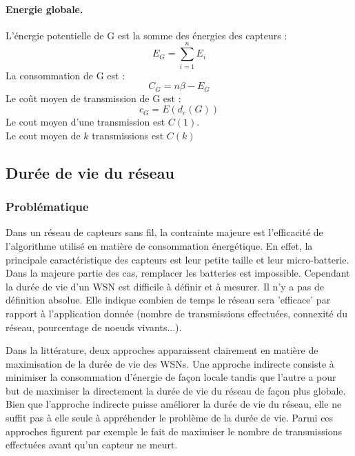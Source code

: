 \paragraph{Energie globale.}
\begin{mydef}
 L'énergie potentielle de G est la somme des énergies des capteurs :$$E_G=\sum_{i=1}^n{E_i}$$
 La consommation de  G est :$$C_G=n\beta - E_G$$
 Le coût moyen de transmission de  G est :$$c_G=E(d_e(G))$$
 Le cout moyen d'une transmission est $C(1)$.\\
 Le cout moyen de $k$ transmissions est $C(k)$
\end{mydef}


\subsection{Durée de vie du réseau}
\subsubsection{Problématique}


Dans un réseau de capteurs sans fil, la contrainte majeure est l'efficacité de l'algorithme utilisé en matière de consommation énergétique. En effet, la principale caractéristique des capteurs
est leur petite taille et leur micro-batterie. Dans la majeure partie des cas, remplacer les batteries est impossible. Cependant la durée de vie d'un WSN est difficile à définir et à mesurer.
Il n'y a pas de définition absolue. Elle indique combien de temps le réseau sera 'efficace' par rapport à l'application donnée (nombre de transmissions effectuées, connexité du réseau, pourcentage de noeuds vivants...).

Dans la littérature, deux approches apparaissent clairement en matière de maximisation de la durée de vie des WSNs. Une approche indirecte consiste à minimiser la consommation d'énergie de façon locale tandis que l'autre a pour but 
de maximiser la directement la durée de vie du réseau de façon plus globale. Bien que l'approche indirecte puisse améliorer la durée de vie du réseau, elle ne suffit pas à elle seule à appréhender le problème de la durée de vie.
Parmi ces approches figurent  par exemple le fait de maximiser le nombre de transmissions effectuées avant qu'un capteur ne meurt.

